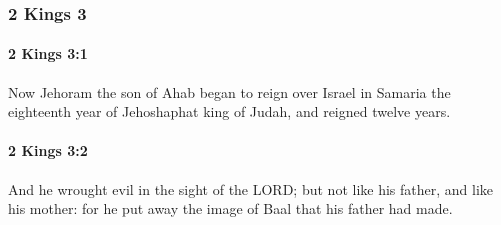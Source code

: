 	\subsubsection{2 Kings 3} %
		\label{2KINGS-3}

		\paragraph{2 Kings 3:1} %
			\label{2KINGS-3-1}

			Now Jehoram the son of Ahab began to reign over Israel in Samaria the eighteenth year of Jehoshaphat king of Judah, and reigned twelve years.


		\paragraph{2 Kings 3:2} %
			\label{2KINGS-3-2}

			And he wrought evil in the sight of the LORD; but not like his father, and like his mother: for he put away the image of Baal that his father had made.

